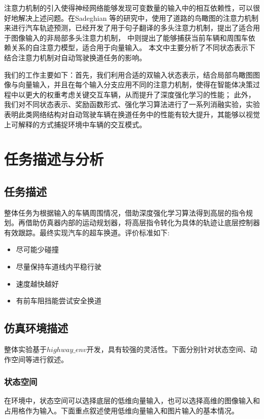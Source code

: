 \documentclass[letterpaper, 10 pt, conference]{ieeeconf}  %
\begin{document}
注意力机制的引入使得神经网络能够发现可变数量的输入中的相互依赖性，可以很好地解决上述问题。在Sadeghian 等\cite{sadeghian2018car}的研究中，使用了道路的鸟瞰图的注意力机制来进行汽车轨迹预测，\cite{vaswani2017attention}已经开发了用于句子翻译的多头注意力机制，\cite{messaoud2019non}提出了适合用于图像输入的非局部多头注意力机制，\cite{leurent2019social}
中则提出了能够捕获当前车辆和周围车依赖关系的自注意力模型，适合用于向量输入。
本文中主要分析了不同状态表示下结合注意力机制对自动驾驶换道任务的影响。

我们的工作主要如下：首先，我们利用合适的双输入状态表示，结合局部鸟瞰图图像与向量输入，并且在每个输入分支应用不同的注意力机制，使得在智能体决策过程中以更大的权重考虑关键交互车辆，从而提升了深度强化学习的性能；
此外，我们对不同状态表示、奖励函数形式、强化学习算法进行了一系列消融实验，实验表明此类网络结构对自动驾驶车辆在换道任务中的性能有较大提升，其能够以视觉上可解释的方式捕捉环境中车辆的交互模式。


\section{任务描述与分析}

\subsection{任务描述}

整体任务为根据输入的车辆周围情况，借助深度强化学习算法得到高层的指令规划。再借助仿真器内部的运动规划器，将高层指令转化为具体的轨迹让底层控制器有效跟踪。最终实现汽车的超车换道。评价标准如下:
\begin{itemize}
    \item 尽可能少碰撞
    \item 尽量保持车道线内平稳行驶
    \item 速度越快越好
    \item 有前车阻挡能尝试安全换道
\end{itemize}

\subsection{仿真环境描述}
整体实验基于$highway\_env$\cite{highway-env}开发，具有较强的灵活性。下面分别针对状态空间、动作空间等进行叙述。
\subsubsection{状态空间}
在环境中，状态空间可以选择底层的低维向量输入，也可以选择高维的图像输入和占用格作为输入。下面重点叙述使用低维向量输入和图片输入的基本情况。
\end{document}
